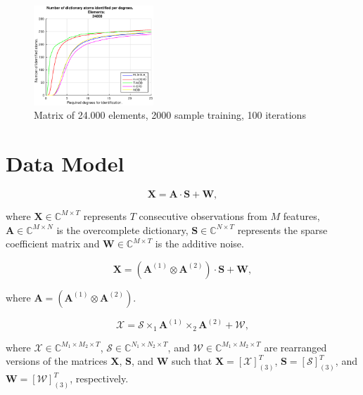 \documentclass[conference]{IEEEtran}
\begin{document}
\begin{figure}[!htb]
     \centering 
	 \includegraphics[width=0.4\textwidth]{figures/5_20_2000_24000_100.eps}
     \caption{Matrix of 24.000 elements, 2000 sample training, 100 iterations}
     \label{fig:facets_cross}
\end{figure}

\section{Data Model}

\begin{equation}\label{eq:eq01}
\boldsymbol{X} = \boldsymbol{A} \cdot \boldsymbol{S} + \boldsymbol{W},
\end{equation}

where $\boldsymbol{X} \in \mathbb{C}^{M \times T}$ represents $T$ consecutive observations from $M$ features, $\boldsymbol{A} \in \mathbb{C}^{M \times N}$ is the overcomplete dictionary, $\boldsymbol{S} \in \mathbb{C}^{N \times T}$ represents the sparse coefficient matrix and $\boldsymbol{W} \in \mathbb{C}^{M \times T}$ is the additive noise.

\begin{equation}\label{eq:eq02}
\boldsymbol{X} = (\boldsymbol{A}^{(1)} \otimes \boldsymbol{A}^{(2)}) \cdot \boldsymbol{S} + \boldsymbol{W},
\end{equation}

where $\boldsymbol{A} = (\boldsymbol{A}^{(1)} \otimes \boldsymbol{A}^{(2)})$.

\begin{equation}\label{eq:eq03}
\boldsymbol{\mathcal{X}} = \boldsymbol{\mathcal{S}} \times_1 \boldsymbol{A}^{(1)} \times_2 \boldsymbol{A}^{(2)} +  \boldsymbol{\mathcal{W}},
\end{equation}

where $\boldsymbol{\mathcal{X}} \in \mathbb{C}^{M_1 \times M_2 \times T}$, $\boldsymbol{\mathcal{S}} \in \mathbb{C}^{N_1 \times N_2 \times T}$, and $\boldsymbol{\mathcal{W}} \in \mathbb{C}^{M_1 \times M_2 \times T}$ are rearranged versions of the matrices $\boldsymbol{X}$, $\boldsymbol{S}$, and $\boldsymbol{W}$ such that $\boldsymbol{X} = [\boldsymbol{\mathcal{X}}]_{(3)}^T$, $\boldsymbol{S} = [\boldsymbol{\mathcal{S}}]_{(3)}^T$, and $\boldsymbol{W} = [\boldsymbol{\mathcal{W}}]_{(3)}^T$, respectively.
\end{document}
